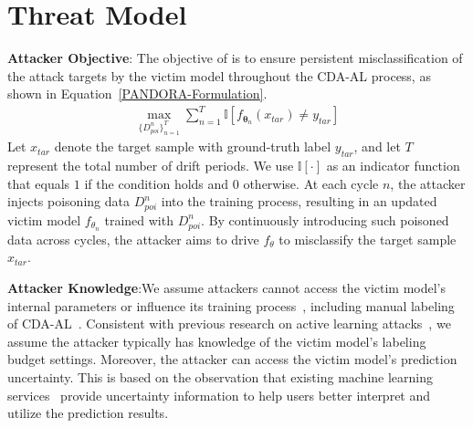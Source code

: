 \section{Threat Model}
\label{Sec: Threat Model}
\textbf{Attacker Objective}: The objective of \pandora is to ensure persistent misclassification of the attack targets by the victim model throughout the CDA-AL process, as shown in Equation~\ref{PANDORA-Formulation}.
\begin{equation}
	\begin{aligned}
			\max_{ \{ D_{poi}^{n} \}_{n=1}^{T} } \sum_{n=1}^{T} \mathbb{I}[ f_{\bm{\theta}_{n}}(x_{tar}) \neq y_{tar} ]
	\end{aligned}
	\label{PANDORA-Formulation}
\end{equation}
Let $x_{tar}$ denote the target sample with ground-truth label $y_{tar}$, and let $T$ represent the total number of drift periods.
We use $\mathbb{I}[\cdot]$ as an indicator function that equals $1$ if the condition holds and $0$ otherwise.
At each cycle $n$, the attacker injects poisoning data $D_{poi}^{n}$ into the training process, resulting in an updated victim model $f_{\theta_{n}}$ trained with $D_{poi}^{n}$.
By continuously introducing such poisoned data across cycles, the attacker aims to drive $f_{\theta}$ to misclassify the target sample $x_{tar}$.

\textbf{Attacker Knowledge}:We assume attackers cannot access the victim model's internal parameters or influence its training process~\cite{2017-ASIACCS-Black-Box-Attack}, including manual labeling of CDA-AL~\cite{2023-Usenix-chenyizhen}.
Consistent with previous research on active learning attacks~\cite{2021-Usenix-active-learning-backdoor}, we assume the attacker typically has knowledge of the victim model's labeling budget settings.
Moreover, the attacker can access the victim model’s prediction uncertainty.
This is based on the observation that existing machine learning services~\cite{2025-Baidu-Image-Recognition} provide uncertainty information to help users better interpret and utilize the prediction results.

